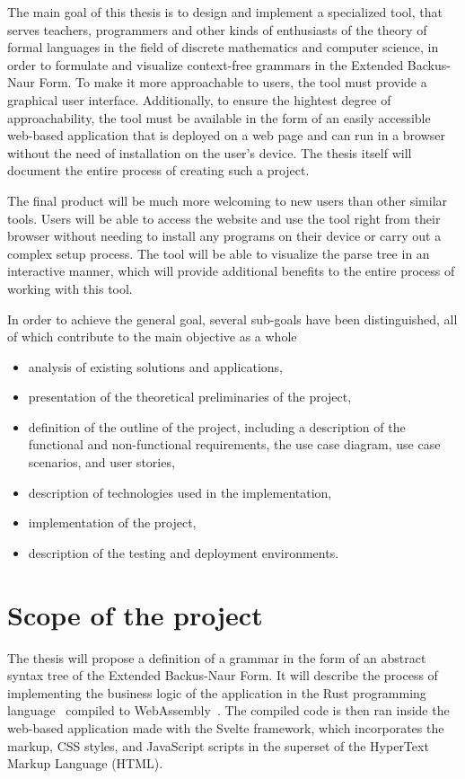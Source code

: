 \documentclass[english,bachelors,forcepolishlogotype]{wizthesis}
\begin{document}
The main goal of this thesis is to design and implement a specialized tool, that
serves teachers, programmers and other kinds of enthusiasts of the theory of
formal languages in the field of discrete mathematics and computer science, in
order to formulate and visualize context-free grammars in the Extended
Backus-Naur Form. To make it more approachable to users, the tool must provide a
graphical user interface. Additionally, to ensure the hightest degree of
approachability, the tool must be available in the form of an easily accessible
web-based application that is deployed on a web page and can run in a browser
without the need of installation on the user's device. The thesis itself will
document the entire process of creating such a project.

The final product will be much more welcoming to new users than other similar
tools. Users will be able to access the website and use the tool right from
their browser without needing to install any programs on their device or carry
out a complex setup process. The tool will be able to visualize the parse tree
in an interactive manner, which will provide additional benefits to the entire
process of working with this tool.

In order to achieve the general goal, several sub-goals have been
distinguished, all of which contribute to the main objective as a whole
\begin{itemize}
  \item analysis of existing solutions and applications,
  \item presentation of the theoretical preliminaries of the project,
  \item definition of the outline of the project, including a description of the
  functional and non-functional requirements, the use case diagram, use case
  scenarios, and user stories,
  \item description of technologies used in the implementation,
  \item implementation of the project,
  \item description of the testing and deployment environments.
\end{itemize}

\section{Scope of the project}

The thesis will propose a definition of a grammar in the form of an abstract
syntax tree of the Extended Backus-Naur Form. It will describe the process of
implementing the business logic of the application in the Rust programming
language~\cite{rust} compiled to WebAssembly~\cite{webassembly}. The compiled
code is then ran inside the web-based application made with the Svelte
framework, which incorporates the markup, CSS styles, and JavaScript scripts in
the superset of the HyperText Markup Language (HTML).
\end{document}
